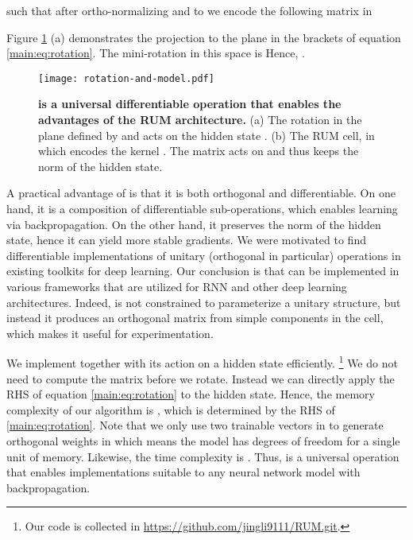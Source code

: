 \documentclass{article} \usepackage{iclr2018_conference,times}
\begin{document}
such that after ortho-normalizing  and  to
 we encode the following matrix in 

Figure \ref{main:fig:rotation-and-model} (a) demonstrates the projection to the plane  in the brackets of equation \eqref{main:eq:rotation}. The mini-rotation in this space is  Hence,
.

\begin{figure}[h]
\begin{center}
\texttt{[image: rotation-and-model.pdf]}
\end{center}
\caption{ \textbf{is a universal differentiable operation that enables the advantages of the RUM architecture.}  (a) The rotation  in the plane defined by  and  acts on the hidden state . (b) The RUM cell, in which  encodes the kernel . The matrix  acts on  and thus keeps the norm of the hidden state. 
\label{main:fig:rotation-and-model}}
\end{figure}

A practical advantage of  is that it is both orthogonal and differentiable. On one hand, it is a composition of differentiable sub-operations, which enables learning via backpropagation. On the other hand, it preserves the norm of the hidden state, hence it can yield more stable gradients. We were motivated to find differentiable implementations of unitary (orthogonal in particular) operations in existing toolkits for deep learning. Our conclusion is that  can be implemented in various frameworks that are utilized for RNN and other deep learning architectures. Indeed,  is not constrained to parameterize a unitary structure, but instead it produces an orthogonal matrix from simple components in the cell, which makes it useful for experimentation.



We implement  together with its action on a hidden state efficiently. 
\footnote{Our code is collected in \url{https://github.com/jingli9111/RUM.git}.} 
We do not need to compute the matrix  before we rotate. Instead we can directly apply the RHS of equation \eqref{main:eq:rotation} to the hidden state. Hence, the memory complexity of our algorithm is , which is determined by the RHS of \eqref{main:eq:rotation}. Note that we only use two trainable vectors in  to generate orthogonal weights in  which means the model has  degrees of freedom for a single unit of memory. Likewise, the time complexity is . Thus,  is a universal operation that enables implementations suitable to any neural network model with backpropagation.
\end{document}
